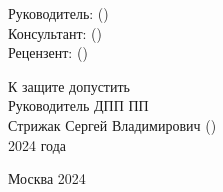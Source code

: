 \vfill

    {\fontsize{12}{12}\selectfont\noindent Руководитель: \hfill (\underline{\hspace{7cm}})} \\
    {\fontsize{12}{12}\selectfont\noindent Консультант: \hfill (\underline{\hspace{7cm}})} \\
    {\fontsize{12}{12}\selectfont\noindent Рецензент: \hfill (\underline{\hspace{7cm}})} \\

    \vspace{20pt}

    {\fontsize{12}{12}\selectfont\noindent
        К защите допустить \\
        Руководитель ДПП ПП \\
        Стрижак Сергей Владимирович \hfill (\underline{\hspace{3cm}}) \\
        \underline{\hspace{1cm}} \underline{\hspace{2cm}} 2024 года}

\vfill

\begin{center}
    Москва 2024
\end{center}